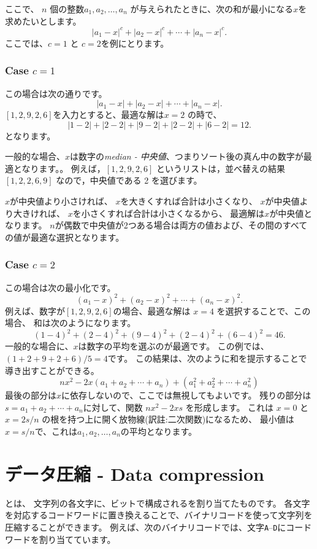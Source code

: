 ここで、 $n$ 個の整数$a_1,a_2,\ldots,a_n$
が与えられたときに、次の和が最小になる$x$を求めたいとします。
\[|a_1-x|^c+|a_2-x|^c+\cdots+|a_n-x|^c.\]
ここでは、$c=1$ と $c=2$を例にとります。

\subsubsection{Case $c=1$}

この場合は次の通りです。
\[|a_1-x|+|a_2-x|+\cdots+|a_n-x|.\]
$[1,2,9,2,6]$を入力とすると、最適な解は$x=2$
の時で、
\[
|1-2|+|2-2|+|9-2|+|2-2|+|6-2|=12.
\]
となります。

一般的な場合、$x$は数字の\textit{median - 中央値}、つまりソート後の真ん中の数字が最適となります。。
例えば，$[1,2,9,2,6]$ というリストは，並べ替えの結果 $[1,2,2,6,9]$ なので，中央値である 2 を選びます。

$x$が中央値より小さければ、
$x$を大きくすれば合計は小さくなり、
$x$が中央値より大きければ、
$x$を小さくすれば合計は小さくなるから、
最適解は$x$が中央値となります。
$n$が偶数で中央値が2つある場合は両方の値および、その間のすべての値が最適な選択となります。

\subsubsection{Case $c=2$}

この場合は次の最小化です。
\[(a_1-x)^2+(a_2-x)^2+\cdots+(a_n-x)^2.\]
例えば、数字が$[1,2,9,2,6]$の場合、最適な解は $x = 4$ を選択することで、この場合、
和は次のようになります。
\[
(1-4)^2+(2-4)^2+(9-4)^2+(2-4)^2+(6-4)^2=46.
\]
一般的な場合に、$x$は数字の平均を選ぶのが最適です。
この例では、$(1+2+9+2+6)/5=4$です。
この結果は、次のように和を提示することで導き出すことができる。
\[
nx^2 - 2x(a_1+a_2+\cdots+a_n) + (a_1^2+a_2^2+\cdots+a_n^2)
\]
最後の部分は$x$に依存しないので、ここでは無視してもよいです。
残りの部分は$s=a_1+a_2+\cdots+a_n$に対して、関数 $nx^2-2xs$ を形成します。
これは $x = 0$ と $x = 2s/n$ の根を持つ上に開く放物線(訳註:二次関数)になるため、
最小値は$x=s/n$で、これは$a_1,a_2,\ldots,a_n$の平均となります。

\section{データ圧縮 - Data compression}


とは、
文字列の各文字に、ビットで構成されるを割り当てたものです。
各文字を対応するコードワードに置き換えることで、バイナリコードを使って文字列を圧縮することができます。
例えば、次のバイナリコードでは、文字\texttt{A}–\texttt{D}にコードワードを割り当てています。


